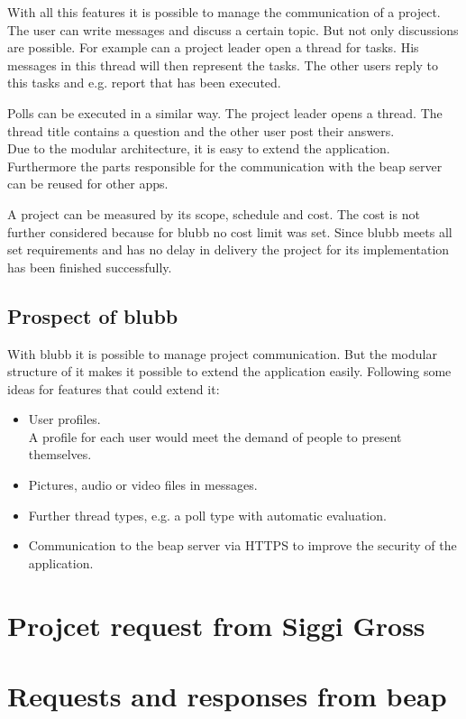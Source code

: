 \documentclass[12pt,a4paper,oneside]{report}
\newcommand{\appname}{blubb}
\newcommand{\beapServer}{beap server}
\begin{document}
With all this features it is possible to manage the communication of a project. The user can write messages and discuss a certain topic. But not only discussions are possible.
For example can a project leader open a thread for tasks. His messages in this thread will then represent the tasks. The other users reply to this tasks and e.g. report that has been executed. 

Polls can be executed in a similar way. The project leader opens a thread. The thread title contains a question and the other user post their answers.\\

Due to the modular architecture, it is easy to extend the application. Furthermore the parts responsible for the communication with the \beapServer{} can be reused for other apps. 

A project can be measured by its scope, schedule and cost. The cost is not further considered because for \appname{} no cost limit was set. 
Since \appname{} meets all set requirements and has no delay in delivery the project for its implementation has been finished successfully. 

\section{Prospect of blubb}
With \appname{} it is possible to manage project communication. But the modular structure of it makes it possible to extend the application easily. 
Following some ideas for features that could extend it:
\begin{itemize}
\item User profiles. \\
A profile for each user would meet the demand of people to present themselves. 
\item Pictures, audio or video files in messages. 
\item Further thread types, e.g. a poll type with automatic evaluation.
\item Communication to the \beapServer{} via HTTPS to improve the security of the application.
\end{itemize}
\appendix
\chapter{Projcet request from Siggi Gross} \label{sec:letter}


   
\chapter{Requests and responses from beap}
\lstset{language=JavaScript}
\end{document}
